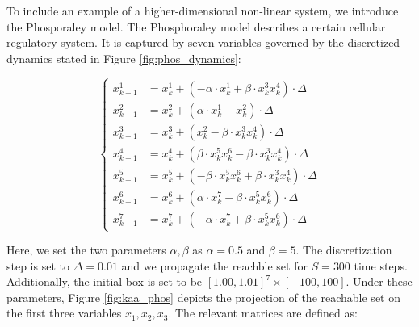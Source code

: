 \begin{example}
To include an example of a higher-dimensional non-linear system, we introduce the Phosporaley model. The Phosphoraley model describes a certain cellular regulatory system. It is captured by seven variables governed by the discretized dynamics stated in Figure \ref{fig:phos_dynamics}:

\begin{center}
  \begin{equation*}
    \begin{cases}
        x^1_{k+1} &= x^1_k + ( -\alpha \cdot x^1_k + \beta \cdot x^3_k x^4_k)\cdot \Delta \\
        x^2_{k+1} &= x^2_k + (  \alpha\cdot  x^1_k - x^2_k)\cdot \Delta \\
        x^3_{k+1} &= x^3_k + ( x^2_k - \beta \cdot x^3_k x^4_k)\cdot \Delta \\
        x^4_{k+1} &= x^4_k + ( \beta \cdot x^5_k x^6_k - \beta \cdot x^3_k x^4_k)\cdot \Delta \\
        x^5_{k+1} &= x^5_k + ( -\beta \cdot x^5_k x^6_k + \beta \cdot x^3_k x^4_k)\cdot \Delta \\
        x^6_{k+1} &= x^6_k + ( \alpha\cdot  x^7_k - \beta \cdot x^5_k x^6_k)\cdot \Delta \\
        x^7_{k+1} &= x^7_k + ( -\alpha\cdot  x^7_k + \beta \cdot  x^5_k x^6_k)\cdot \Delta
    \end{cases}
  \end{equation*}
  \label{fig:phos_dynamics}
\end{center}
%
Here, we set the two parameters $\alpha,\beta$ as $\alpha=0.5$ and $\beta=5$. The discretization step is set to $\Delta =0.01$ and we propagate the reachble set for $S=300$ time steps. Additionally, the initial box is set to be $[1.00,1.01]^7 \times [-100, 100]$. Under these parameters, Figure \ref{fig:kaa_phos} depicts the projection of the reachable set on the first three variables $x_1, x_2, x_3$. The relevant matrices are defined as:


\end{example}
